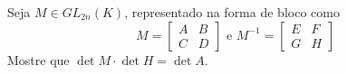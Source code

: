 Seja \(M \in GL_{2n}(K)\), representado na forma de bloco como 
\[
M = \left[ \begin{array}{cc} A & B \\ C & D \end{array} \right] \text{ e } M^{-1} = \left[ \begin{array}{cc} E & F \\ G & H \end{array} \right]
\]
Mostre que \(\det M \cdot \det H = \det A\).
